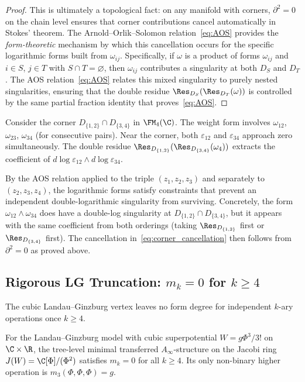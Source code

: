 \begin{proof}
This is ultimately a topological fact: on any manifold with corners, $\partial^2 = 0$ on the chain level ensures that corner contributions cancel automatically in Stokes' theorem. The Arnold--Orlik--Solomon relation~\eqref{eq:AOS} provides the \emph{form-theoretic} mechanism by which this cancellation occurs for the specific logarithmic forms built from $\omega_{ij}$. Specifically, if $\omega$ is a product of forms $\omega_{ij}$ and $i \in S$, $j \in T$ with $S \cap T = \varnothing$, then $\omega_{ij}$ contributes a singularity at both $D_S$ and $D_T$. The AOS relation~\eqref{eq:AOS} relates this mixed singularity to purely nested singularities, ensuring that the double residue $\Res_{D_S}(\Res_{D_T}(\omega))$ is controlled by the same partial fraction identity that proves~\eqref{eq:AOS}.
\end{proof}

\begin{example}[Arnold cancellation for $k=4$, $S=\{1,2\}$, $T=\{3,4\}$]
\label{ex:arnold_k4}
Consider the corner $D_{\{1,2\}} \cap D_{\{3,4\}}$ in $\FM_4(\C)$. The weight form involves $\omega_{12}$, $\omega_{23}$, $\omega_{34}$ (for consecutive pairs). Near the corner, both $\varepsilon_{12}$ and $\varepsilon_{34}$ approach zero simultaneously. The double residue $\Res_{D_{\{1,2\}}}(\Res_{D_{\{3,4\}}}(\omega_4))$ extracts the coefficient of $d\log\varepsilon_{12} \wedge d\log\varepsilon_{34}$.

By the AOS relation applied to the triple $(z_1, z_2, z_3)$ and separately to $(z_2, z_3, z_4)$, the logarithmic forms satisfy constraints that prevent an independent double-logarithmic singularity from surviving. Concretely, the form $\omega_{12} \wedge \omega_{34}$ does have a double-log singularity at $D_{\{1,2\}} \cap D_{\{3,4\}}$, but it appears with the same coefficient from both orderings (taking $\Res_{D_{\{1,2\}}}$ first or $\Res_{D_{\{3,4\}}}$ first). The cancellation in~\eqref{eq:corner_cancellation} then follows from $\partial^2 = 0$ as proved above.
\end{example}


\subsection{Rigorous LG Truncation: $m_k = 0$ for $k \geq 4$}
\label{subsec:truncation_complete}

The cubic Landau--Ginzburg vertex leaves no form degree for independent
$k$-ary operations once $k\geq 4$.

\begin{theorem}
\label{thm:LG_truncation_full}
For the Landau--Ginzburg model with cubic superpotential
$W=g\Phi^3/3!$ on $\C\times\R$, the tree-level minimal transferred
\(A_\infty\)-structure on the Jacobi ring \(J(W)=\C[\Phi]/(\Phi^2)\)
satisfies \(m_k=0\) for all \(k\geq4\). Its only non-binary higher
operation is \(m_3(\Phi,\Phi,\Phi)=g\).
\end{theorem}

